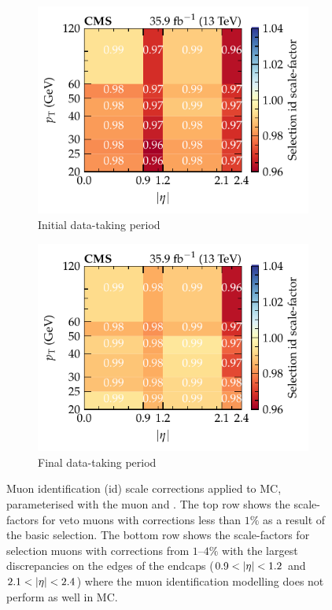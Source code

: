 \begin{figure}[htb]
    \\
    \begin{subfigure}[b]{0.49\textwidth}
        \centering
        \includegraphics{chapters/041_corrections/images/efficiencies/objects/muons/muon_id_tight_runbf.pdf}
        \caption{Initial data-taking period}
        \label{subfigc:muon-id-scale-factors}
    \end{subfigure}
    \hfill
    \begin{subfigure}[b]{0.49\textwidth}
        \centering
        \includegraphics{chapters/041_corrections/images/efficiencies/objects/muons/muon_id_tight_rungh.pdf}
        \caption{Final data-taking period}
        \label{subfigd:muon-id-scale-factors}
    \end{subfigure}
    \caption[Corrections to simulated muon identification efficiencies.]{
        Muon identification (id) scale corrections applied to MC, parameterised with the muon \pt and \aeta. The top row shows the scale-factors for veto muons with corrections less than $1\%$ as a result of the basic selection. The bottom row shows the scale-factors for selection muons with corrections from {$1$--$4\%$} with the largest discrepancies on the edges of the endcaps (${0.9<\aeta<1.2}$ and ${2.1<\aeta<2.4}$) where the muon identification modelling does not perform as well in MC. 
    }
    \label{fig:muon-id-scale-factors}
\end{figure}

